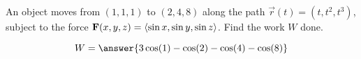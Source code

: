 \documentclass{ximera}
\author{David Guichard \and Neal Koblitz \and H. Jerome Keisler \and Albert Scheller \and Barry Balof \and Mike Wills \and Matthew Carr}
\begin{document}
\begin{exercise}




An object moves from $(1,1,1)$ to $(2,4,8)$ along the path $\vec{r}(t)=(t,t^2,t^3)$, subject to the force $\mathbf{F}(x,y,z)=\left\langle \sin x,\sin y,\sin z\right\rangle$. Find the work $W$ done.
\begin{prompt}
\[
W=\answer{3\cos(1)-\cos(2)-\cos(4)-\cos(8)}
\]
\end{prompt}



\end{exercise}
\end{document}
